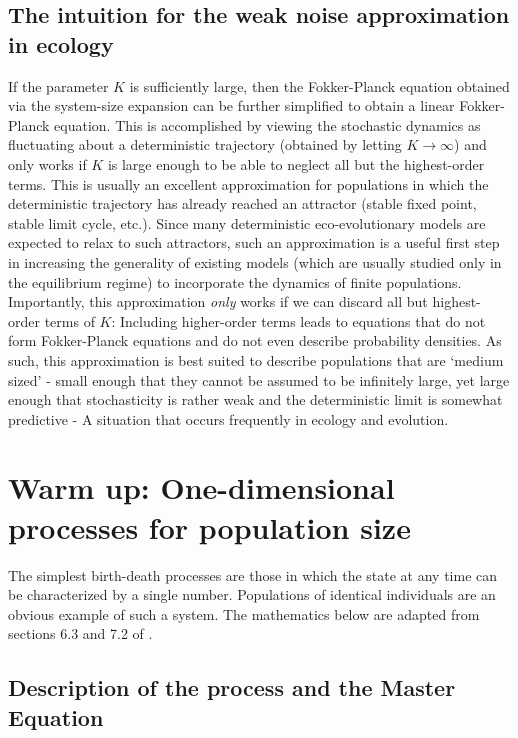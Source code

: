 \subsection{The intuition for the weak noise approximation in ecology}
If the parameter $K$ is sufficiently large, then the Fokker-Planck equation obtained via the system-size expansion can be further simplified to obtain a linear Fokker-Planck equation. This is accomplished by viewing the stochastic dynamics as fluctuating about a deterministic trajectory (obtained by letting $K \to \infty$) and only works if $K$ is large enough to be able to neglect all but the highest-order terms. This is usually an excellent approximation for populations in which the deterministic trajectory has already reached an attractor (stable fixed point, stable limit cycle, etc.). Since many deterministic eco-evolutionary models are expected to relax to such attractors, such an approximation is a useful first step in increasing the generality of existing models (which are usually studied only in the equilibrium regime) to incorporate the dynamics of finite populations. Importantly, this approximation \emph{only} works if we can discard all but highest-order terms of $K$: Including higher-order terms leads to equations that do not form Fokker-Planck equations and do not even describe probability densities. As such, this approximation is best suited to describe populations that are `medium sized' - small enough that they cannot be assumed to be infinitely large, yet large enough that stochasticity is rather weak and the deterministic limit is somewhat predictive - A situation that occurs frequently in ecology and evolution.

\section{Warm up: One-dimensional processes for population size}\label{sec_1D_processes}
The simplest birth-death processes are those in which the state at any time can be characterized by a single number. Populations of identical individuals are an obvious example of such a system. The mathematics below are adapted from sections 6.3 and 7.2 of \citep{gardiner_stochastic_2009}.

\subsection{Description of the process and the Master Equation}

